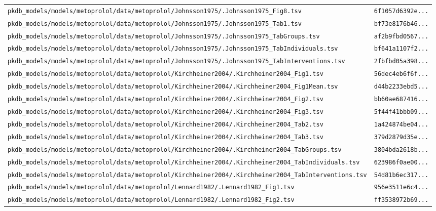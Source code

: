 \documentclass{article}
\begin{document}
\begin{longtable}{ll}
\texttt{pkdb\_models/models/metoprolol/data/metoprolol/Johnsson1975/.Johnsson1975\_Fig8.tsv} & \texttt{6f1057d6392e...} \\
\texttt{pkdb\_models/models/metoprolol/data/metoprolol/Johnsson1975/.Johnsson1975\_Tab1.tsv} & \texttt{bf73e8176b46...} \\
\texttt{pkdb\_models/models/metoprolol/data/metoprolol/Johnsson1975/.Johnsson1975\_TabGroups.tsv} & \texttt{af2b9fbd0567...} \\
\texttt{pkdb\_models/models/metoprolol/data/metoprolol/Johnsson1975/.Johnsson1975\_TabIndividuals.tsv} & \texttt{bf641a1107f2...} \\
\texttt{pkdb\_models/models/metoprolol/data/metoprolol/Johnsson1975/.Johnsson1975\_TabInterventions.tsv} & \texttt{2fbfbd05a398...} \\
\texttt{pkdb\_models/models/metoprolol/data/metoprolol/Kirchheiner2004/.Kirchheiner2004\_Fig1.tsv} & \texttt{56dec4eb6f6f...} \\
\texttt{pkdb\_models/models/metoprolol/data/metoprolol/Kirchheiner2004/.Kirchheiner2004\_Fig1Mean.tsv} & \texttt{d44b2233ebd5...} \\
\texttt{pkdb\_models/models/metoprolol/data/metoprolol/Kirchheiner2004/.Kirchheiner2004\_Fig2.tsv} & \texttt{bb60ae687416...} \\
\texttt{pkdb\_models/models/metoprolol/data/metoprolol/Kirchheiner2004/.Kirchheiner2004\_Fig3.tsv} & \texttt{5f44f41bbb09...} \\
\texttt{pkdb\_models/models/metoprolol/data/metoprolol/Kirchheiner2004/.Kirchheiner2004\_Tab2.tsv} & \texttt{1a424874be04...} \\
\texttt{pkdb\_models/models/metoprolol/data/metoprolol/Kirchheiner2004/.Kirchheiner2004\_Tab3.tsv} & \texttt{379d2879d35e...} \\
\texttt{pkdb\_models/models/metoprolol/data/metoprolol/Kirchheiner2004/.Kirchheiner2004\_TabGroups.tsv} & \texttt{3804bda2618b...} \\
\texttt{pkdb\_models/models/metoprolol/data/metoprolol/Kirchheiner2004/.Kirchheiner2004\_TabIndividuals.tsv} & \texttt{623986f0ae00...} \\
\texttt{pkdb\_models/models/metoprolol/data/metoprolol/Kirchheiner2004/.Kirchheiner2004\_TabInterventions.tsv} & \texttt{54d81b6ec317...} \\
\texttt{pkdb\_models/models/metoprolol/data/metoprolol/Lennard1982/.Lennard1982\_Fig1.tsv} & \texttt{956e3511e6c4...} \\
\texttt{pkdb\_models/models/metoprolol/data/metoprolol/Lennard1982/.Lennard1982\_Fig2.tsv} & \texttt{ff3538972b69...} \\

\end{longtable}
\end{document}
